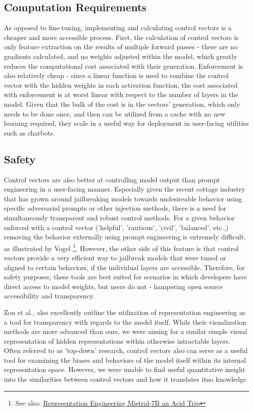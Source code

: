 \documentclass[11pt,a4paper]{article}
\begin{document}
\subsection{Computation Requirements}
As opposed to fine-tuning, implementing and calculating control vectors is a cheaper and more accessible process. First, the calculation of control vectors is only feature extraction on the results of multiple forward passes - there are no gradients calculated, and no weights adjusted within the model, which greatly reduces the computational cost associated with their generation. Enforcement is also relatively cheap - since a linear function is used to combine the control vector with the hidden weights in each activation function, the cost associated with enforcement is at worst linear with respect to the number of layers in the model. Given that the bulk of the cost is in the vectors' generation, which only needs to be done once, and then can be utilized from a cache with no new learning required, they scale in a useful way for deployment in user-facing utilities such as chatbots.

\subsection{Safety}
Control vectors are also better at controlling model output than prompt engineering in a user-facing manner. Especially given the recent cottage industry that has grown around jailbreaking models towards undesireable behavior using specific adversarial prompts or other injection methods, there is a need for simultaneously transparent and robust control methods. For a given behavior enforced with a control vector ('helpful', 'cautious', 'civil', 'balanced', etc.,) removing the behavior externally using prompt engineering is extremely difficult, as illustrated by Vogel \cite{vogel2024repeng} \footnote{See also: \href{https://vgel.me/posts/representation-engineering/}{Representation Engineering Mistral-7B an Acid Trip}}. However, the other side of this feature is that control vectors provide a very efficient way to jailbreak models that were tuned or aligned to certain behaviors, if the individual layers are accessible. Therefore, for safety purposes, these tools are best suited for scenarios in which developers have direct access to model weights, but users do not - hampering open source accessibility and transparency.

Zou et al., \cite{zou2023representation} also excellently outline the utilization of representation engineering as a tool for transparency with regards to the model itself. While their visualization methods are more advanced than ours, we were aiming for a similar simple visual representation of hidden representations within otherwise intractable layers. Often referred to as 'top-down' research, control vectors also can serve as a useful tool for examining the biases and behaviors of the model itself within its internal representation space. However, we were unable to find useful quantitative insight into the similarities between control vectors and how it translates itno knowledge 
\end{document}

